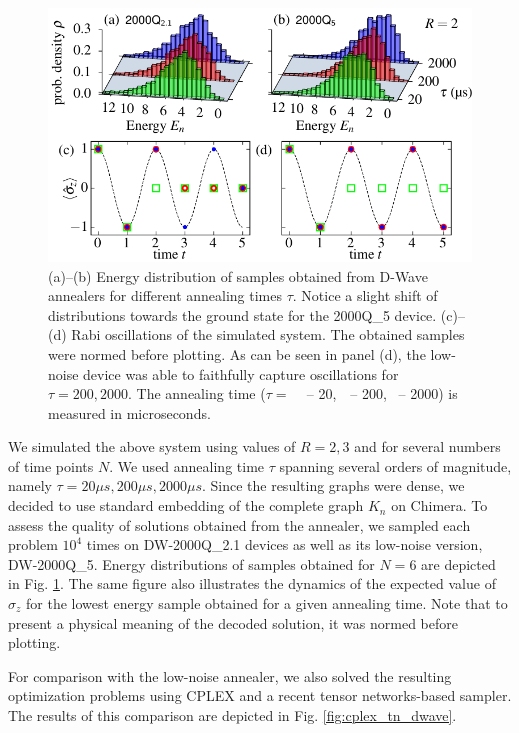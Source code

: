 \begin{figure}[!h]
  \centering
  \includegraphics{figures/fig2.pdf}
  \caption{(a)--(b) Energy distribution of samples obtained from D-Wave annealers for different annealing times $\tau$. Notice a slight shift of distributions towards the ground state for the 2000Q\_{5} device. (c)--(d) Rabi oscillations of the simulated system. The obtained samples were normed before plotting. As can be seen in panel (d), the low-noise device was able to faithfully capture oscillations for $\tau=200, 2000$.
    The annealing time ($\tau=$
    \tikzquad\,\,\, -- 20,
    \,\tikzcircle\,\,\,-- 200,
    \,\tikzdot\,\,-- 2000)
    is measured in microseconds.
  }
  \label{fig:energy-hist}
\end{figure}

We simulated the above system using values of $R=2, 3$ and for several numbers
of time points $N$. We used annealing time $\tau$ spanning several orders of
magnitude, namely $\tau=20\mu s, 200 \mu s, 2000 \mu s$. Since the resulting
graphs were dense, we decided to use standard embedding of the complete graph
$K_n$ on Chimera. To assess the quality of solutions obtained from the
annealer, we sampled each problem $10^4$ times on DW-2000Q\_{2.1} devices as
well as its low-noise version, DW-2000Q\_{5}. Energy distributions of samples
obtained for $N=6$ are depicted in Fig. \ref{fig:energy-hist}. The same figure
also illustrates the dynamics of the expected value of $\sigma_z$ for the
lowest energy sample obtained for a given annealing time. Note that to present
a physical meaning of the decoded solution, it was normed before plotting.

For comparison with the low-noise annealer, we also solved the resulting
optimization problems using CPLEX and a recent tensor networks-based sampler.
The results of this comparison are depicted in Fig. \ref{fig:cplex_tn_dwave}.

